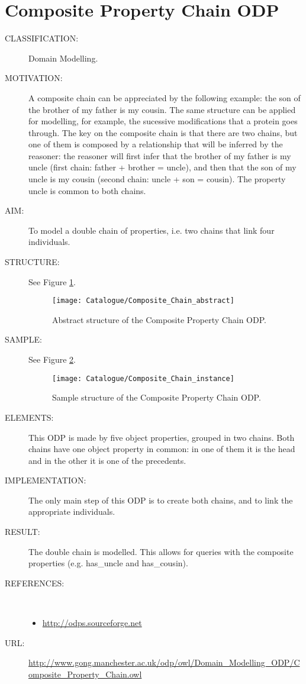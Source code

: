  \section{Composite Property Chain ODP}\begin{description}
\item [CLASSIFICATION:] Domain Modelling.

\item [MOTIVATION:] A composite chain can be appreciated by the following example: the son of the brother of my father is my cousin. The same structure can be applied for modelling, for example, the sucessive modifications that a protein goes through. The key on the composite chain is that there are two chains, but one of them is composed by a relationship that will be inferred by the reasoner: the reasoner will first infer that the brother of my father is my uncle (first chain: father + brother = uncle), and then that the son of my uncle is my cousin (second chain: uncle + son = cousin). The property uncle is common to both chains.

\item [AIM:] To model a double chain of properties, i.e. two chains that link four individuals.

\item [STRUCTURE:] See Figure \ref{odp:Composite_Chain_abstract}.
\begin{figure}[]\centering\texttt{[image: Catalogue/Composite\_Chain\_abstract]}\caption{\label{odp:Composite_Chain_abstract} Abstract structure of the Composite Property Chain ODP.}\end{figure}

\item [SAMPLE:] See Figure \ref{odp:Composite_Chain_instance}.
\begin{figure}[]\centering\texttt{[image: Catalogue/Composite\_Chain\_instance]}\caption{\label{odp:Composite_Chain_instance} Sample structure of the Composite Property Chain ODP.}\end{figure}

\item [ELEMENTS:] This ODP is made by five object properties, grouped in two chains. Both chains have one object property in common: in one of them it is the head and in the other it is one of the precedents.

\item [IMPLEMENTATION:] The only main step of this ODP is to create both chains, and to link the appropriate individuals.

\item [RESULT:] The double chain is modelled. This allows for queries with the composite properties (e.g. has\_uncle and has\_cousin).

\item [REFERENCES: ] ~\begin{itemize}
\item \url{http://odps.sourceforge.net}\end{itemize}
\item [URL: ] \url{http://www.gong.manchester.ac.uk/odp/owl/Domain_Modelling_ODP/Composite_Property_Chain.owl} \end{description}